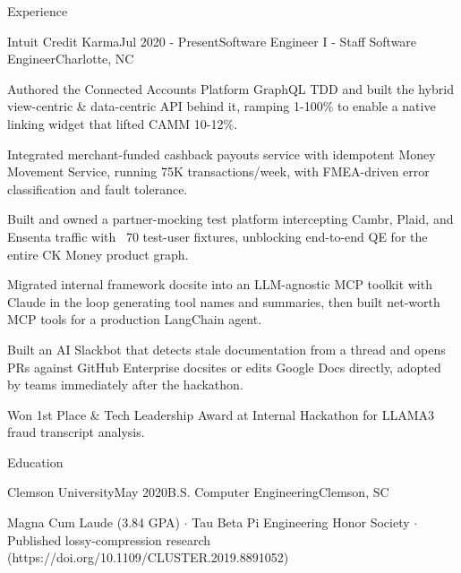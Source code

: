 \documentclass{resume} %
\begin{document}
\begin{rSection}{Experience}
\begin{rSubsection}{Intuit Credit Karma}{Jul 2020 - Present}{Software Engineer I - Staff Software Engineer}{Charlotte, NC}
\item Authored the Connected Accounts Platform GraphQL TDD and built the hybrid view-centric \& data-centric API behind it, ramping 1-100\% to enable a native linking widget that lifted CAMM 10-12\%.

\item Integrated merchant-funded cashback payouts service with idempotent Money Movement Service, running 75K transactions/week, with FMEA-driven error classification and fault tolerance.

\item Built and owned a partner-mocking test platform intercepting Cambr, Plaid, and Ensenta traffic with ~70 test-user fixtures, unblocking end-to-end QE for the entire CK Money product graph.

\item Migrated internal framework docsite into an LLM-agnostic MCP toolkit with Claude in the loop generating tool names and summaries, then built net-worth MCP tools for a production LangChain agent.

\item Built an AI Slackbot that detects stale documentation from a thread and opens PRs against GitHub Enterprise docsites or edits Google Docs directly, adopted by teams immediately after the hackathon.

\item Won 1st Place \& Tech Leadership Award at Internal Hackathon for LLAMA3 fraud transcript analysis.

\end{rSubsection}

\end{rSection}

\begin{rSection}{Education}

\begin{rSubsection}{Clemson University}{May 2020}{B.S. Computer Engineering}{Clemson, SC}
\item Magna Cum Laude (3.84 GPA) $\cdot$ Tau Beta Pi Engineering Honor Society $\cdot$ Published lossy-compression research (https://doi.org/10.1109/CLUSTER.2019.8891052)
\end{rSubsection}

\end{rSection}
\end{document}
